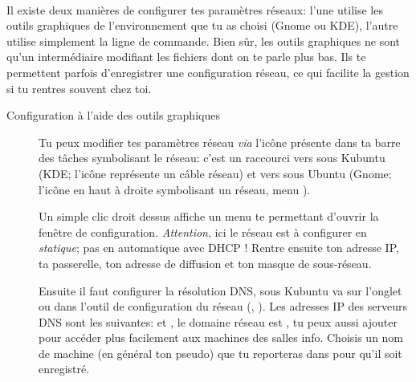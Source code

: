 \paragraph{}
\label{Ubuntu:IP}
Il existe deux manières de configurer tes paramètres réseaux: l'une utilise les outils graphiques de l'environnement que tu as choisi (Gnome ou KDE), l'autre utilise simplement la ligne de commande. Bien sûr, les outils graphiques ne sont qu'un intermédiaire modifiant les fichiers dont on te parle plus bas. Ils te permettent parfois d'enregistrer une configuration réseau, ce qui facilite la gestion si tu rentres souvent chez toi.

\begin{description}
\item[Configuration à l'aide des outils graphiques]
Tu peux modifier tes paramètres réseau \emph{via} l'icône présente dans ta barre des tâches symbolisant le réseau: c'est un raccourci vers  sous Kubuntu (KDE; l'icône représente un c\^able réseau) et vers  sous Ubuntu (Gnome; l'icône en haut à droite symbolisant un réseau, menu ).

Un simple clic droit dessus affiche un menu te permettant d'ouvrir la fenêtre de configuration. \emph{Attention}, ici le réseau est à configurer en \emph{statique}; pas en automatique avec DHCP ! Rentre ensuite ton adresse IP, ta passerelle, ton adresse de diffusion et ton masque de sous-réseau.

Ensuite il faut configurer la résolution DNS, sous Kubuntu va sur l'onglet  ou dans l'outil de configuration du réseau
(, ). Les adresses IP des serveurs DNS sont les suivantes:  et , le domaine réseau
est , tu peux aussi ajouter  pour accéder plus facilement aux machines des salles info. Choisis un nom de machine
(en général ton pseudo) que tu reporteras dans  pour qu'il soit enregistré.




\end{description}
